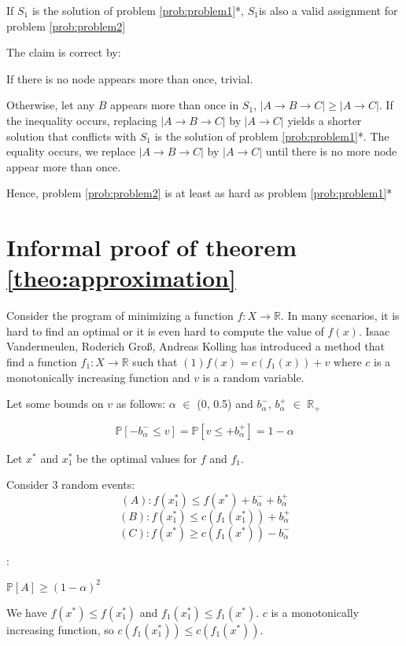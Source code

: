 If $S_1$ is the solution of problem \ref{prob:problem1}*, $S_1$is also a valid assignment for problem \ref{prob:problem2}

The claim is correct by:

If there is no node appears more than once, trivial.

Otherwise, let any $B$ appears more than once in $S_1$, $|A \to B \to C| \geq |A \to C|$. If the inequality occurs, replacing $|A \to B \to C|$ by $|A \to C|$ yields a shorter solution that conflicts with $S_1$ is the solution of problem \ref{prob:problem1}*. The equality occurs, we replace $|A \to B \to C|$ by $|A \to C|$ until there is no more node appear more than once.

Hence, problem \ref{prob:problem2} is at least as hard as problem \ref{prob:problem1}*

\section{Informal proof of theorem \ref{theo:approximation}}


Consider the program of minimizing a function $f: X \to \mathbb{R}$. In many scenarios, it is hard to find an optimal or it is even hard to compute the value of $f(x)$. Isaac Vandermeulen, Roderich Groß, Andreas Kolling \cite{vandermeulen2019balanced} has introduced a method that find a function $f_1: X \to \mathbb{R}$ such that $(1) f(x) = c(f_1(x)) + v$ where $c$ is a monotonically increasing function and $v$ is a random variable. 

Let some bounds on $v$ as follows: $\alpha$ $\in$ (0, 0.5) and $b_\alpha^-$, $b_\alpha^+$ $\in$ $\mathbb{R}_+$

\[
\mathbb{P}[-b_\alpha^- \leq v] = \mathbb{P}[v \leq +b_\alpha^+] = 1 - \alpha
\]

Let $x^*$ and $x^*_1$ be the optimal values for $f$ and $f_1$.

Consider 3 random events:
\[
(A): f(x^*_1) \leq f(x^*) + b_\alpha^- + b_\alpha^+
\]
\[
(B): f(x^*_1) \leq c(f_1(x^*_1)) + b_\alpha^+
\]
\[
(C): f(x^*) \geq c(f_1(x^*)) - b_\alpha^-
\]

\begin{theorem}[Approximation]:

$\mathbb{P}[A] \geq (1 - \alpha)^2$

\label{theo:approximation}
\end{theorem}


We have $f(x^*) \leq f(x^*_1)$ and $f_1(x^*_1) \leq f_1(x^*)$. $c$ is a monotonically increasing function, so $c(f_1(x^*_1)) \leq c(f_1(x^*))$. 

